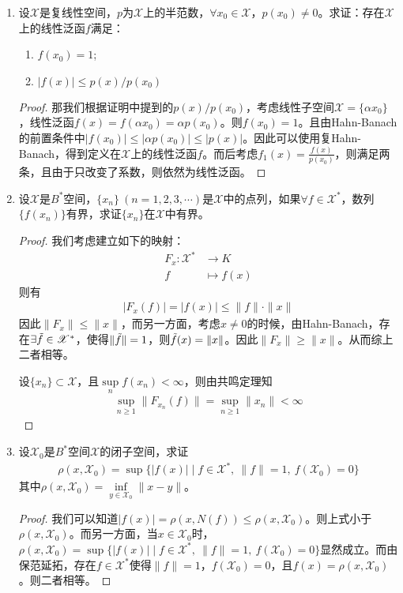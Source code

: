 \begin{enumerate}[leftmargin=2cm, label=\arabic*]
		\item 设$\mathscr{X}$是复线性空间，$p$为$\mathscr{X}$上的半范数，$\forall x_0\in\mathscr{X}$，$p(x_0)\neq 0$。求证：存在$\mathscr{X}$上的线性泛函$f$满足：
		\begin{enumerate}[leftmargin=1cm, label=(\arabic*)]
			\item $f(x_0) = 1$;
			\item $|f(x)|\leqslant p(x)/p(x_0)$
		\end{enumerate}
		\begin{proof}
			那我们根据证明中提到的$p(x)/p(x_0)$，考虑线性子空间$\mathscr{X}=\{\alpha x_0\}$，线性泛函$f(x) = f(\alpha x_0) = \alpha p(x_0)$。则$f(x_0) = 1$。且由Hahn-Banach的前置条件中$|f(x_0)| \leqslant |\alpha p(x_0)| \leqslant |p(x)|$。因此可以使用复Hahn-Banach，得到定义在$\mathscr{X}$上的线性泛函$f$。而后考虑$f_1(x) = \frac{f(x)}{p(x_0)}$，则满足两条，且由于只改变了系数，则依然为线性泛函。
		\end{proof}
		
		\item 设$\mathscr{X}$是$B^*$空间，$\{x_n\}\ (n=1,2,3,\cdots)$是$\mathscr{X}$中的点列，如果$\forall f\in\mathscr{X}^*$，数列$\{f(x_n)\}$有界，求证$\{x_n\}$在$\mathscr{X}$中有界。
		\begin{proof}
			我们考虑建立如下的映射：
			\begin{align*}
				F_x: \mathscr{X}^* &\to K \\
				f &\mapsto f(x)
			\end{align*}
			则有
			\begin{align*}
				|F_x(f)| = |f(x)| \leqslant \|f\| \cdot \|x\|
			\end{align*}
			因此$\|F_x\| \leqslant \|x\|$，而另一方面，考虑$x\neq 0$的时候，由Hahn-Banach，存在$\exists \Tilde{f}\in\mathscr{X}^*$，使得$\|\Tilde{f}\| = 1$，则$\Tilde{f}(x) = \|x\|$。因此$\|F_x\| \geqslant \|x\|$。从而综上二者相等。
			
			设$\{x_n\}\subset \mathscr{X}$，且$\sup\limits_{n} f(x_n) < \infty$，则由共鸣定理知
			\begin{align*}
				\sup\limits_{n\geqslant 1} \|F_{x_n}(f)\| = \sup\limits_{n\geqslant 1} \|x_n\| <\infty
			\end{align*}
		\end{proof}
		
		\item 设$\mathscr{X}_0$是$B^*$空间$\mathscr{X}$的闭子空间，求证
		\begin{align*}
			\rho(x,\mathscr{X}_0) = \sup \{|f(x)| \mid f\in \mathscr{X}^*,\ \|f\| = 1,\ f(\mathscr{X}_0) = 0\}
		\end{align*}
		其中$\rho(x,\mathscr{X}_0) = \inf\limits_{y\in\mathscr{X}_0} \|x - y\|$。
		\begin{proof}
			我们可以知道$|f(x)| = \rho(x,N(f)) \leqslant \rho(x,\mathscr{X}_0)$。则上式小于$\rho(x,\mathscr{X}_0)$。而另一方面，当$x\in\mathscr{X}_0$时，$\rho(x,\mathscr{X}_0) = \sup \{|f(x)| \mid f\in \mathscr{X}^*,\ \|f\| = 1,\ f(\mathscr{X}_0) = 0\}$显然成立。而由保范延拓，存在$f\in\mathscr{X}^*$使得$\|f\| = 1$，$f(\mathscr{X}_0) = 0$，且$f(x) = \rho(x,\mathscr{X}_0)$。则二者相等。
		\end{proof}
		

\end{enumerate}
